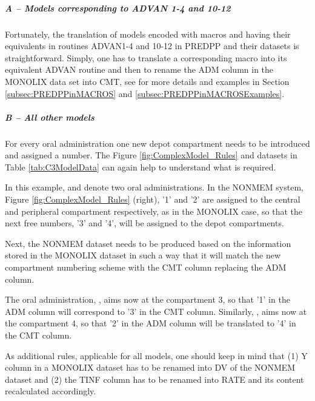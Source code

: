 
\subparagraph{A -- Models corresponding to ADVAN 1-4 and 10-12}
Fortunately, the translation of models encoded with macros and having their equivalents 
in routines ADVAN1-4 and 10-12 in PREDPP and their datasets is straightforward. 
Simply, one has to translate a corresponding macro into its equivalent ADVAN 
routine and then to rename the ADM column in the MONOLIX data set into CMT, 
see for more details and examples in Section \ref{subsec:PREDPPinMACROS}
and \ref{subsec:PREDPPinMACROSExamples}.

\subparagraph{B -- All other models}
For every oral administration one new depot compartment needs to be introduced
and assigned a number. The Figure \ref{fig:ComplexModel_Rules} and datasets 
in Table \ref{tab:C3ModelData} can again help to understand what is required. 

In this example,  and  denote two oral administrations. 
In the NONMEM system, Figure \ref{fig:ComplexModel_Rules} (right), '1' and '2' are  
assigned to the central and peripheral compartment respectively, as in the MONOLIX 
case, so that the next free numbers, '3' and '4', will be assigned to the depot 
compartments. 

Next, the NONMEM dataset needs to be produced based on the information stored 
in the MONOLIX dataset in such a way that it will match the new compartment 
numbering scheme with the CMT column replacing the ADM column. 

The oral administration, , aims now at the compartment 3, so that '1' 
in the ADM column will correspond to '3' in the CMT column. Similarly, , 
aims now at the compartment 4, so that '2' in the ADM column will be translated to '4' 
in the CMT column.

As additional rules, applicable for all models, one should keep in mind that 
(1) Y column in a MONOLIX dataset has to be renamed into DV of the NONMEM dataset 
and (2) the TINF column has to be renamed into RATE 
and its content recalculated accordingly. 


